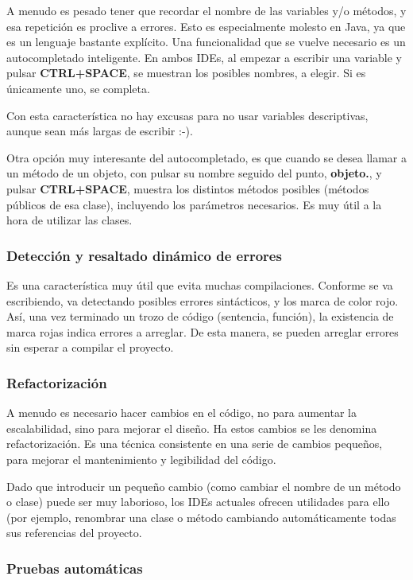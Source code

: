 \documentclass[11pt]{article}
\begin{document}
A menudo es pesado tener que recordar el nombre de las variables y/o métodos, y esa repetición es proclive a errores. 
Esto es especialmente molesto en Java, ya que es un lenguaje bastante explícito. 
Una funcionalidad que se vuelve necesario es un autocompletado inteligente. En ambos IDEs, al empezar a escribir
una variable y pulsar \textbf{CTRL+SPACE}, se muestran los posibles nombres, a elegir. Si es únicamente uno, se completa. 


Con esta característica no hay excusas para no usar variables descriptivas, aunque sean más largas de escribir :-). 


Otra opción muy interesante del autocompletado, es que cuando se desea llamar a un método de un objeto, 
con pulsar su nombre seguido del punto, \textbf{objeto.}, y pulsar \textbf{CTRL+SPACE}, muestra los distintos métodos posibles
(métodos públicos de esa clase), incluyendo los parámetros necesarios. Es muy útil a la hora de utilizar
las clases.
\subsubsection{Detección y resaltado dinámico de errores}
\label{sec-3-2-2}




Es una característica muy útil que evita muchas compilaciones. Conforme se va escribiendo, va detectando
posibles errores sintácticos, y los marca de color rojo. Así, una vez terminado un trozo de código (sentencia, 
función), la existencia de marca rojas indica errores a arreglar. De esta manera, se pueden arreglar
errores sin esperar a compilar el proyecto.
\subsubsection{Refactorización}
\label{sec-3-2-3}




A menudo es necesario hacer cambios en el código, no para aumentar la escalabilidad, sino para mejorar el diseño.
Ha estos cambios se les denomina refactorización. Es una técnica consistente en una serie de cambios pequeños, para
mejorar el mantenimiento y legibilidad del código. 


Dado que introducir un pequeño cambio (como cambiar el nombre de un método o clase) puede ser muy laborioso, los
IDEs actuales ofrecen utilidades para ello (por ejemplo, renombrar una clase o método cambiando automáticamente
todas sus referencias del proyecto. 
\subsubsection{Pruebas automáticas}
\label{sec-3-2-4}
\end{document}
